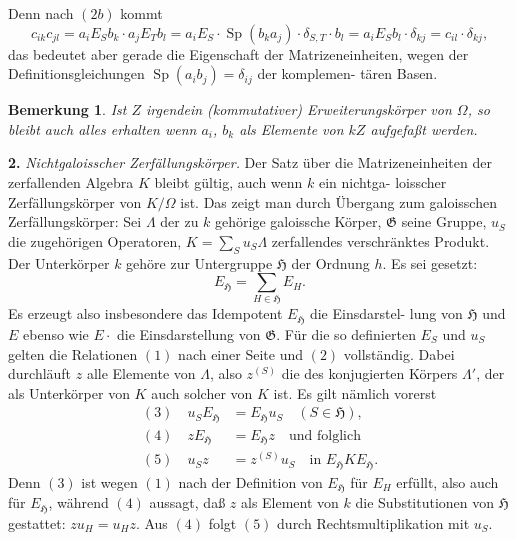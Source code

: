 \documentclass[12pt,a4paper]{article}
\theoremstyle{plain}
\newtheorem*{bemerkung}{Bemerkung}
\newcommand{\Ga}{\mathfrak{G}}
\DeclareMathOperator{\Sp}{Sp}
\begin{document}
Denn nach $(2b)$ kommt
\[
c_{ik} c_{jl} = a_i E_S b_k \cdot a_j E_T b_l
= a_i E_S \cdot \Sp(b_k a_j) \cdot \delta_{S,T} \cdot b_l
= a_i E_S b_l \cdot \delta_{kj}
= c_{il} \cdot \delta_{kj},
\]
das bedeutet aber gerade die Eigenschaft der Matrizeneinheiten,
wegen der Definitionsgleichungen $\Sp(a_i b_j) = \delta_{ij}$ der komplemen-
t\"aren Basen.

\begin{bemerkung}
Ist $Z$ irgendein (kommutativer) Erweiterungsk\"orper von $\Omega$,
so bleibt auch alles erhalten wenn $a_i$, $b_k$ als Elemente von
$kZ$ aufgefa\ss t werden.
\end{bemerkung}


\medskip
\noindent\textbf{2.}\hspace{0.5em}%
\emph{Nichtgaloisscher Zerf\"allungsk\"orper.}\hspace{0.5em}%
Der Satz \"uber die
Matrizeneinheiten der zerfallenden Algebra $K$ bleibt g\"ultig, auch wenn $k$ ein nichtga-
loisscher Zerf\"allungsk\"orper von $K/\Omega$ ist. Das zeigt man durch
\"Ubergang zum galoisschen Zerf\"allungsk\"orper: Sei $\Lambda$ der zu $k$
geh\"orige galoissche K\"orper, $\Ga$ seine Gruppe, $u_S$ die zugeh\"origen
Operatoren, $K = \sum_S u_S \Lambda$ zerfallendes verschr\"anktes Produkt. Der
Unterk\"orper $k$ geh\"ore zur Untergruppe $\mathfrak{H}$ der Ordnung $h$. Es sei
gesetzt:
\[
E_{\mathfrak{H}} = \sum_{H \in \mathfrak{H}} E_H.
\]
Es erzeugt also insbesondere das Idempotent $E_{\mathfrak{H}}$ die Einsdarstel-
lung von $\mathfrak{H}$ und $E$ ebenso wie $E \cdot$ die Einsdarstellung von $\Ga$.
F\"ur die so definierten $E_S$ und $u_S$ gelten die Relationen $(1)$ nach einer
Seite und $(2)$ vollst\"andig. Dabei durchl\"auft $z$ alle Elemente von $\Lambda$,
also $z^{(S)}$ die des konjugierten K\"orpers $\Lambda'$, der als Unterk\"orper
von $K$ auch solcher von $K$ ist. Es gilt n\"amlich vorerst
\begin{align}
(3) \quad u_S E_{\mathfrak{H}} &= E_{\mathfrak{H}} u_S \quad (S \in \mathfrak{H}), \\
(4) \quad z E_{\mathfrak{H}} &= E_{\mathfrak{H}} z \quad \text{und folglich} \\
(5) \quad u_S z &= z^{(S)} u_S \quad \text{in } E_{\mathfrak{H}} K E_{\mathfrak{H}}.
\end{align}
Denn $(3)$ ist wegen $(1)$ nach der Definition von $E_{\mathfrak{H}}$ f\"ur $E_H$ erf\"ullt,
also auch f\"ur $E_{\mathfrak{H}}$, w\"ahrend $(4)$ aussagt, da\ss{} $z$ als Element von $k$
die Substitutionen von $\mathfrak{H}$ gestattet: $z u_H = u_H z$. Aus $(4)$ folgt $(5)$
durch Rechtsmultiplikation mit $u_S$.
\end{document}
